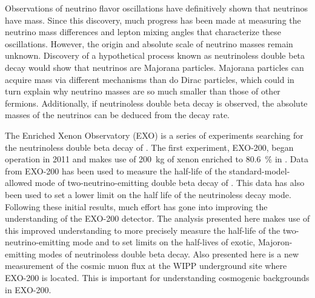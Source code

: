 Observations of neutrino flavor oscillations have definitively shown that neutrinos have mass. Since this discovery, much progress has been made at measuring the neutrino mass differences and lepton mixing angles that characterize these oscillations. However, the origin and absolute scale of neutrino masses remain unknown. Discovery of a hypothetical process known as neutrinoless double beta decay would show that neutrinos are Majorana particles. Majorana particles can acquire mass via different mechanisms than do Dirac particles, which could in turn explain why neutrino masses are so much smaller than those of other fermions. Additionally, if neutrinoless double beta decay is observed, the absolute masses of the neutrinos can be deduced from the decay rate.

The Enriched Xenon Observatory (EXO) is a series of experiments searching for the neutrinoless double beta decay of . The first experiment, EXO-200, began operation in 2011 and makes use of \SI{200}{\kg} of xenon enriched to \SI{80.6}{\percent} in . Data from EXO-200 has been used to measure the half-life of the standard-model-allowed mode of two-neutrino-emitting double beta decay of . This data has also been used to set a lower limit on the half life of the neutrinoless decay mode. Following these initial results, much effort has gone into improving the understanding of the EXO-200 detector. The analysis presented here makes use of this improved understanding to more precisely measure the half-life of the two-neutrino-emitting mode and to set limits on the half-lives of exotic, Majoron-emitting modes of neutrinoless double beta decay. Also presented here is a new measurement of the cosmic muon flux at the WIPP underground site where EXO-200 is located. This is important for understanding cosmogenic backgrounds in EXO-200.

